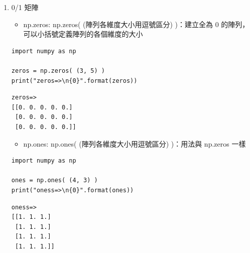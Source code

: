 \documentclass[a4paper,12pt]{article}
\begin{document}
\begin{enumerate}
\item 0/1 矩陣
\label{sec:orge7f3fbb}
\begin{itemize}
\item np.zeros: np.zeros( (陣列各維度大小用逗號區分) )：建立全為 0 的陣列，可以小括號定義陣列的各個維度的大小\\
\end{itemize}
\lstset{breaklines=true,language=Python,label= ,caption= ,captionpos=b,firstnumber=1,numbers=left}
\begin{lstlisting}
import numpy as np

zeros = np.zeros( (3, 5) )
print("zeros=>\n{0}".format(zeros))
\end{lstlisting}

\begin{verbatim}
zeros=>
[[0. 0. 0. 0. 0.]
 [0. 0. 0. 0. 0.]
 [0. 0. 0. 0. 0.]]
\end{verbatim}


\begin{itemize}
\item np.ones: np.ones( (陣列各維度大小用逗號區分) )：用法與 np.zeros 一樣\\
\end{itemize}
\lstset{breaklines=true,language=Python,label= ,caption= ,captionpos=b,firstnumber=1,numbers=left}
\begin{lstlisting}
import numpy as np

ones = np.ones( (4, 3) )
print("oness=>\n{0}".format(ones))
\end{lstlisting}

\begin{verbatim}
oness=>
[[1. 1. 1.]
 [1. 1. 1.]
 [1. 1. 1.]
 [1. 1. 1.]]
\end{verbatim}
\end{enumerate}
\end{document}
